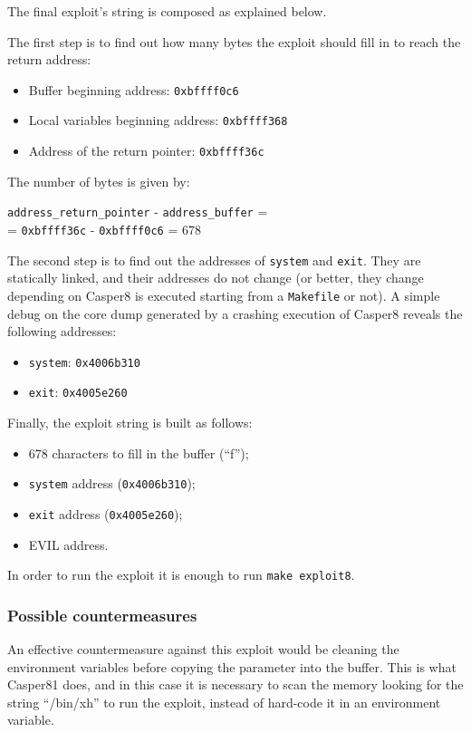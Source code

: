 The final exploit's string is composed as explained below.

The first step is to find out how many bytes the exploit should fill in to reach the return address:
\begin{itemize}
	\item Buffer beginning address: \texttt{0xbffff0c6}
	\item Local variables beginning address: \texttt{0xbffff368}
	\item Address of the return pointer: \texttt{0xbffff36c}
\end{itemize}
The number of bytes is given by:
\begin{center}
	\texttt{address\_return\_pointer} - \texttt{address\_buffer} =\\
	= \texttt{0xbffff36c} - \texttt{0xbffff0c6} = 678
\end{center}

The second step is to find out the addresses of \texttt{system} and \texttt{exit}. They are statically linked, and their addresses do not change (or better, they change depending on Casper8 is executed starting from a \texttt{Makefile} or not). A simple debug on the core dump generated by a crashing execution of Casper8 reveals the following addresses:
\begin{itemize}
	\item \texttt{system}: \texttt{0x4006b310}
	\item \texttt{exit}: \texttt{0x4005e260}
\end{itemize}

Finally, the exploit string is built as follows:
\begin{itemize}
	\item 678 characters to fill in the buffer (``f'');
	\item \texttt{system} address (\texttt{0x4006b310});
	\item \texttt{exit} address (\texttt{0x4005e260});
	\item EVIL address.
\end{itemize}

In order to run the exploit it is enough to run \texttt{make exploit8}.

\subsubsection{Possible countermeasures}
An effective countermeasure against this exploit would be cleaning the environment variables before copying the parameter into the buffer. This is what Casper81 does, and in this case it is necessary to scan the memory looking for the string ``/bin/xh'' to run the exploit, instead of hard-code it in an environment variable.

